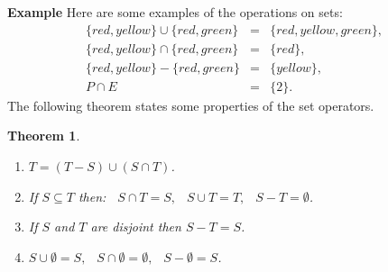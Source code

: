 \documentclass[12pt,a4paper]{article}
\newtheorem{theorem}{Theorem}
\newcommand*{\comma}{,\:}
\newenvironment{example}{\textbf{Example}}{}
\begin{document}
\begin{example} Here are some examples of the operations on sets:
\begin{displaymath}
\begin{array}{lll}
\{\mathit{red}, \mathit{yellow}\} \cup \{\mathit{red}, \mathit{green}\} &=& \{\mathit{red}, \mathit{yellow}, \mathit{green}\}, \\
\{\mathit{red}, \mathit{yellow}\} \cap \{\mathit{red}, \mathit{green}\} &=& \{\mathit{red}\}, \\
\{\mathit{red}, \mathit{yellow}\} - \{\mathit{red}, \mathit{green}\} &=& \{\mathit{yellow}\}, \\
P \cap E &=& \{2\}.
\end{array}
\end{displaymath}
\end{example}
The following theorem states some properties of the set
operators.
\begin{theorem}\label{thm.seteq}\mbox{}
\begin{enumerate}
\item $T = (T-S) \cup (S\cap T)$.

\item If $S\subseteq T$ then:
$\;\;S \cap T = S\comma \;\; S \cup T = T\comma\;\; S - T = \emptyset$.

\item If $S$ and $T$ are disjoint then $S-T=S$.

\item $S \cup \emptyset = S\comma\;\; S \cap \emptyset = \emptyset\comma\;\;
S - \emptyset = S$.
\end{enumerate}
\end{theorem}
\end{document}
